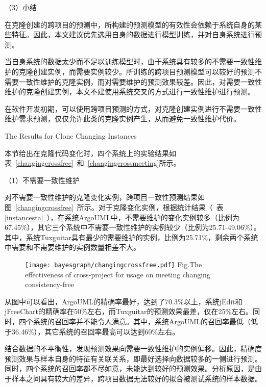 （3）小结

在克隆创建的跨项目的预测中，所构建的预测模型的有效性会依赖于系统自身的某些特征。因此，本文建议优先选用自身的数据进行模型训练，并对自身系统进行预测。

当自身系统的数据太少而不足以训练模型时，由于系统具有较多的不需要一致性维护的克隆创建实例，而需要实例较少。所训练的跨项目预测模型可以较好的预测不需要一致性维护的克隆实例，而对需要维护的预测效果较差。因此，对需要一致性维护的克隆创建实例，本文不建使用系统交叉的方式进行一致性维护进行预测。

在软件开发初期，可以使用跨项目预测的方式，对克隆创建实例进行不需要一致性维护需求预测，仅仅允许此类的克隆实例产生，从而避免一致性维护代价。

{The Results for Clone Changing Instances}

本节给出在克隆代码变化时，四个系统上的实验结果如表~\ref{changingcrossfree}~和~\ref{changingcrossmeeting}所示。


（1）不需要一致性维护

对不需要一致性维护的克隆变化实例，跨项目一致性预测结果如图~\ref{changingcrossfree}~所示。对于克隆变化实例，根据统计结果（~表\ref{instancesta}~），在系统ArgoUML中，不需要维护的变化实例较多（比例为67.45\%），其它三个系统中不需要一致性维护的实例较少（比例为25.71-49.06\%）。其中，系统Tuxguitar具有最少的需要维护的实例，比例为25.71\%，剩余两个系统中需要和不需要维护的实例数量相差不大。

\begin{figure}[htbp]
\centering
\texttt{[image: bayesgraph/changingcrossfree.pdf]}
{Fig.$\!$}{The effectiveness of cross-project for usage on meeting changing consistency-free}
\vspace{-1em}
\end{figure}

从图中可以看出，ArgoUML的精确率最好，达到了70.3\%以上，系统jEdit和jFreeChart的精确率在50\%左右，而Tuxguitar的预测效果最差，仅在25\%左右。同时，四个系统的召回率并不能令人满意。其中，系统ArgoUML的召回率最低（低于36.46\%），其它系统的召回率最高可以达到60\%左右。

结合数据的不平衡性，发现预测效果向需要一致性维护的实例偏移。因此，精确度预测效果与样本自身的特征有关联关系，即最好选择向数据较多的一侧进行预测。同时，四个系统的召回率都不尽如意，未能达到较好的预测效果。分析原因，是由于样本之间具有较大的差异，跨项目数据无法较好的拟合被测试系统的样本数据。

